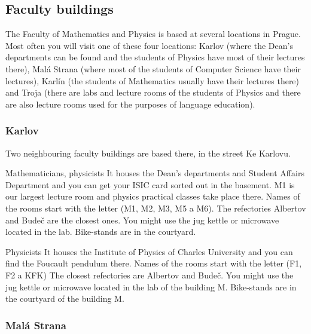 \subsection{Faculty buildings}
The Faculty of Mathematics and Physics is based at several locations in Prague.
Most often you will visit one of these four locations: Karlov (where the Dean's
departments can be found and the students of Physics have most of their lectures
there), Malá Strana (where most of the students of Computer Science have their
lectures), Karlín (the students of Mathematics usually have their lectures
there) and Troja (there are labs and lecture rooms of the students of Physics
and there are also lecture rooms used for the purposes of language education).


\subsubsection{Karlov}
Two neighbouring faculty buildings are based there, in the street Ke Karlovu.

{Mathematicians, physicists}
{It houses the Dean's departments and Student Affairs Department and you can get
your ISIC card sorted out in the basement.
M1 is our largest lecture room and physics practical classes take place there.}
{Names of the rooms start with the letter  (M1, M2, M3, M5 a M6).}
{The refectories Albertov and Budeč are the closest ones. You might use the jug
kettle or microwave located in the lab.}
{Bike-stands are in the courtyard.}

{Physicists}
{It houses the Institute of Physics of Charles University and you can find the
Foucault pendulum there.}
{Names of the rooms start with the letter  (F1, F2 a KFK)}
{The closest refectories are Albertov and Budeč. You might use the jug kettle or
microwave located in the lab of the building M.}
{Bike-stands are in the courtyard of the building M.}

\subsubsection{Malá Strana}

